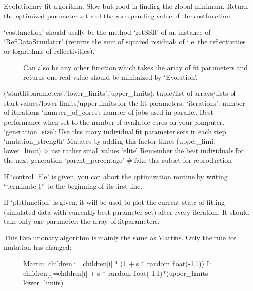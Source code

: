 \documentclass[letterpaper,10pt,english]{sphinxmanual}
\begin{document}
\begin{fulllineitems}
\label{\detokenize{modules-api/fitters:Fitters.Evolution}}
Evolutionary fit algorithm. Slow but good in finding the global minimum.
Return the optimized parameter set and the coresponding value of the costfunction.
\begin{description}
\item[{‘costfunction’ should usally be the method ‘getSSR’ of an instance of ‘ReflDataSimulator’ (returns the sum of squared residuals of i.e. the reflectivities or logarithms of reflectivities).}] \leavevmode
Can also be any other function which takes the array of fit parameters and returns one real value should be minimized by ‘Evolution’.

\end{description}

(‘startfitparameters’,’lower\_limits’,’upper\_limits): tuple/list of arrays/lists of start values/lower limits/upper limits for the fit parameters.
‘iterations’: number of iterations
‘number\_of\_cores’: number of jobs used in parallel. Best performance when set to the number of available cores on your computer.
‘generation\_size’:    Use this many individual fit parameter sets in each step
‘mutation\_strength’ Mutates by adding this factor times (upper\_limit - lower\_limit)  \textendash{}\textgreater{} use rather small values 
‘elite’ Remember the best individuals for the next generation
‘parent\_percentage’ \#Take this subset for reproduction

If ‘control\_file’ is given, you can abort the optimization routine by writing “terminate 1” to the beginning of its first line.

If ‘plotfunction’ is given, it will be used to plot the current state of fitting (simulated data with currently best parameter set) after every iteration. It should take only one parameter: the array of fitparameters.
\begin{description}
\item[{This Evolutionary algorithm is mainly the same as Martins. Only the rule for mutation has changed:}] \leavevmode
Martin: children{[}i{]}=children{[}i{]} * (1 + s * random float(-1,1))
I:      children{[}i{]}=children{[}i{]} + s * random float(-1,1)*(upper\_limits-lower\_limits)

\end{description}

\end{fulllineitems}
\end{document}
